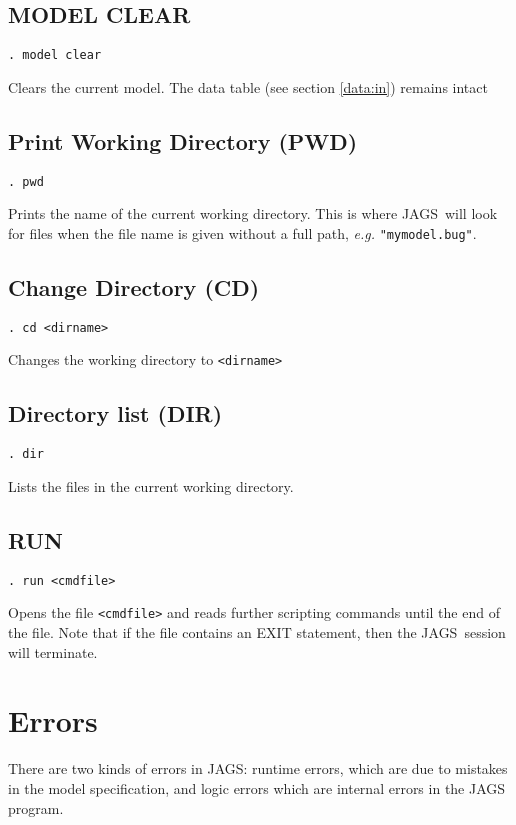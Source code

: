 \documentclass[11pt, a4paper, titlepage]{report}
\newcommand{\JAGS}{\textsf{JAGS}}
\begin{document}
\subsection{MODEL CLEAR}
\label{model:clear}
\begin{verbatim}
. model clear
\end{verbatim}
Clears the current model.  The data table (see section \ref{data:in})
remains intact

\subsection{Print Working Directory (PWD)}
\begin{verbatim}
. pwd
\end{verbatim}
Prints the name of the current working directory. This is where \JAGS\
will look for files when the file name is given without a full path, 
{\em e.g.} \verb+"mymodel.bug"+.

\subsection{Change Directory (CD)}
\begin{verbatim}
. cd <dirname>
\end{verbatim}
Changes the working directory to \texttt{<dirname>}

\subsection{Directory list (DIR)}
\begin{verbatim}
. dir
\end{verbatim}
Lists the files in the current working directory.

\subsection{RUN}
\begin{verbatim}
. run <cmdfile>
\end{verbatim}
Opens the file \texttt{<cmdfile>} and reads further scripting commands
until the end of the file.  Note that if the file contains an EXIT
statement, then the \JAGS\ session will terminate. 


\section{Errors}

There are two kinds of errors in \JAGS: runtime errors, which are due to
mistakes in the model specification, and logic errors which are internal
errors in the JAGS program. 
\end{document}
